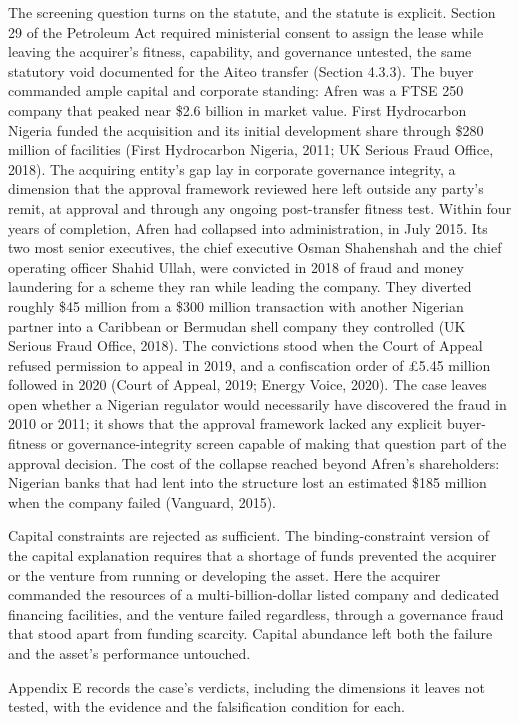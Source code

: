 The screening question turns on the statute, and the statute is
explicit. Section 29 of the Petroleum Act required ministerial consent
to assign the lease while leaving the acquirer's fitness, capability,
and governance untested, the same statutory void documented for the
Aiteo transfer (Section 4.3.3). The buyer commanded ample capital and
corporate standing: Afren was a FTSE 250 company that peaked near \$2.6
billion in market value. First Hydrocarbon Nigeria funded the
acquisition and its initial development share through \$280 million of
facilities (First Hydrocarbon Nigeria, 2011; UK Serious Fraud Office,
2018). The acquiring entity's gap lay in corporate governance integrity,
a dimension that the approval framework reviewed here left outside any
party's remit, at approval and through any ongoing post-transfer fitness
test. Within four years of completion, Afren had collapsed into
administration, in July 2015. Its two most senior executives, the chief
executive Osman Shahenshah and the chief operating officer Shahid Ullah,
were convicted in 2018 of fraud and money laundering for a scheme they
ran while leading the company. They diverted roughly \$45 million from a
\$300 million transaction with another Nigerian partner into a Caribbean
or Bermudan shell company they controlled (UK Serious Fraud Office,
2018). The convictions stood when the Court of Appeal refused permission
to appeal in 2019, and a confiscation order of £5.45 million followed in
2020 (Court of Appeal, 2019; Energy Voice, 2020). The case leaves open
whether a Nigerian regulator would necessarily have discovered the fraud
in 2010 or 2011; it shows that the approval framework lacked any
explicit buyer-fitness or governance-integrity screen capable of making
that question part of the approval decision. The cost of the collapse
reached beyond Afren's shareholders: Nigerian banks that had lent into
the structure lost an estimated \$185 million when the company failed
(Vanguard, 2015).

Capital constraints are rejected as sufficient. The binding-constraint
version of the capital explanation requires that a shortage of funds
prevented the acquirer or the venture from running or developing the
asset. Here the acquirer commanded the resources of a
multi-billion-dollar listed company and dedicated financing facilities,
and the venture failed regardless, through a governance fraud that stood
apart from funding scarcity. Capital abundance left both the failure and
the asset's performance untouched.

Appendix E records the case's verdicts, including the dimensions it
leaves not tested, with the evidence and the falsification condition for
each.

